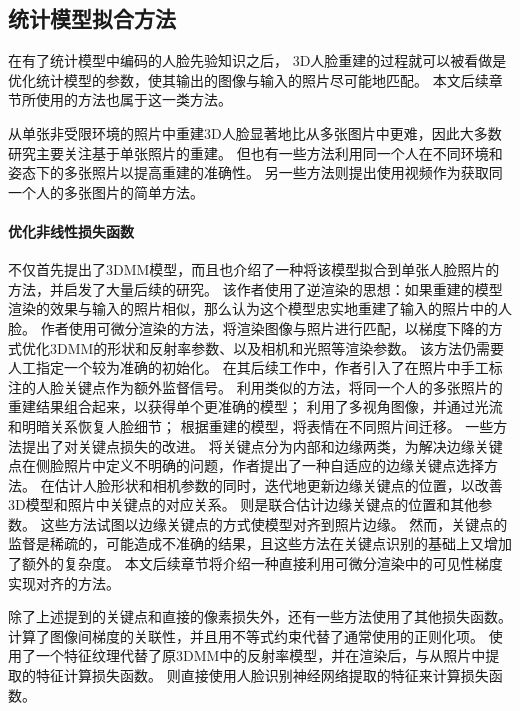 \subsection{统计模型拟合方法}

在有了统计模型中编码的人脸先验知识之后，
3D人脸重建的过程就可以被看做是优化统计模型的参数，使其输出的图像与输入的照片尽可能地匹配。
本文后续章节所使用的方法也属于这一类方法。

从单张非受限环境的照片中重建3D人脸显著地比从多张图片中更难，因此大多数研究主要关注基于单张照片的重建。
但也有一些方法\citep{deep3d,piotraschke2016automated}利用同一个人在不同环境和姿态下的多张照片以提高重建的准确性。
另一些方法\citep{ShiWTC14,GarridoVWT13}则提出使用视频作为获取同一个人的多张图片的简单方法。

\paragraph{优化非线性损失函数}
\citet{3DMM}不仅首先提出了3DMM模型，而且也介绍了一种将该模型拟合到单张人脸照片的方法，并启发了大量后续的研究。
该作者使用了逆渲染的思想：如果重建的模型渲染的效果与输入的照片相似，那么认为这个模型忠实地重建了输入的照片中的人脸。
作者使用可微分渲染的方法，将渲染图像与照片进行匹配，以梯度下降的方式优化3DMM的形状和反射率参数、以及相机和光照等渲染参数。
该方法仍需要人工指定一个较为准确的初始化。
在其后续工作\citep{BlanzV03}中，作者引入了在照片中手工标注的人脸关键点作为额外监督信号。
利用类似的方法，\citet{piotraschke2016automated}将同一个人的多张照片的重建结果组合起来，以获得单个更准确的模型；
\citet{cai2020}利用了多视角图像，并通过光流和明暗关系恢复人脸细节；
\citet{thies2016face2face}根据重建的模型，将表情在不同照片间迁移。
一些方法提出了对关键点损失的改进。
\citet{qu122015adaptive}将关键点分为内部和边缘两类，为解决边缘关键点在侧脸照片中定义不明确的问题，作者提出了一种自适应的边缘关键点选择方法。
\citet{liu2019single}在估计人脸形状和相机参数的同时，迭代地更新边缘关键点的位置，以改善3D模型和照片中关键点的对应关系。
\citet{zhu2015high}则是联合估计边缘关键点的位置和其他参数。
这些方法试图以边缘关键点的方式使模型对齐到照片边缘。
然而，关键点的监督是稀疏的，可能造成不准确的结果，且这些方法在关键点识别的基础上又增加了额外的复杂度。
本文后续章节将介绍一种直接利用可微分渲染中的可见性梯度实现对齐的方法。

除了上述提到的关键点和直接的像素损失外，还有一些方法使用了其他损失函数。
\citet{sariyanidi2020inequality}计算了图像间梯度的关联性，并且用不等式约束代替了通常使用的正则化项。
\citet{booth20183d}使用了一个特征纹理代替了原3DMM中的反射率模型，并在渲染后，与从照片中提取的特征计算损失函数。
\citet{gecer2019ganfit}则直接使用人脸识别神经网络提取的特征来计算损失函数。

